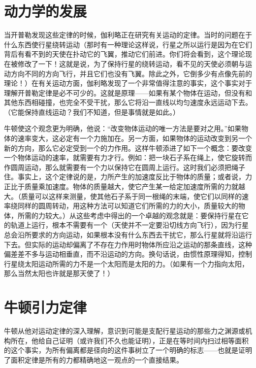 \section{动力学的发展}

当开普勒发现这些定律的时候，伽利略正在研究有关运动的定律。当时的问题在于什么东西使行星绕转运动（那时有一种理论这样说，行星之所以运行是因为在它们背后有看不到的天使在扑动它的飞翼，推动它们前进。你们将会看到，这个理论现在被修改了一下！这就是说，为了保持行星的绕转运动，看不见的天使必须朝与运动方向不同的方向飞行，并且它们也没有飞翼。除此之外，它倒多少有点像先前的理论！）在有关运动方面，伽利略发现了一个非常值得注意的事实，这个事实对于理解开普勒定律是必不可少的。这就是原理——如果有某个物体在运动，但没有和其他东西相碰撞，也完全不受干扰，那么它将沿一直线以均匀速度永远运动下去。（它能保持直线运动？我们不知道，但是事情就是如此。）

牛顿使这个观念更为明确，他说：“改变物体运动的唯一方法是要对之用。”如果物体的速率变大，这必定有一个力施加在。另一方面，如果物体的运动改变到另一个新的方向，那么它必定受到一个的力作用。这样牛顿添进了如下一个概念：要改变一个物体运动的速率，就需要有力才行。例如：把一块石子系在绳上，使它旋转而作圆周运动，那么就需要有一个力以保持它在圆周上运行。这时我们必须把绳子住。事实上，这个定律说的是，力所产生的加速度反比于物体的质量；或者说，力正比于质量乘加速度。物体的质量越大，使它产生某一给定加速度所需的力就越大。（质量可以这样来测量，使其他石子系于同一根绳的末端，使它们以同样的速率绕同样的圆周转动，用这种方法可以知道它们所需的力的大小，质量较大的物体，所需的力较大。）从这些考虑中得出的一个卓越的观念就是：要保持行星在它的轨道上运行，根本不需要有一个（天使并不一定要沿切线方向飞行），因为行星总会沿所要求的方向运动，如果根本没有什么东西去干扰它，那么行星就将沿运行下去。但实际的运动却偏离了不存在力作用时物体所应沿之运动的那条直线，这种偏差差不多与运动相垂直，而不沿运动的方向。换句话说，由惯性原理得知，控制行星绕太阳运动所需的力不是一个太阳而是太阳的力。（如果有一个力指向太阳，那么当然太阳也许就是那天使了！）


\section{牛顿引力定律}

牛顿从他对运动定律的深入理解，意识到可能是支配行星运动的那些力之渊源或机构所在，他给自己证明（或许我们不久也能证明），正是在等时间内扫过相等面积的这个事实，为所有偏离都是径向的这件事树立了一个明确的标志——也就是证明了面积定律是所有的力都精确地这一观点的一个直接结果。

